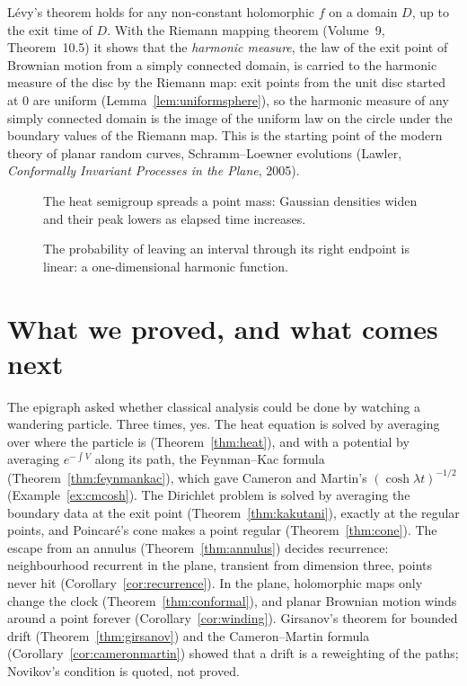 \begin{remark}
L\'evy's theorem holds for any non-constant holomorphic $f$ on a domain $D$, up to the exit time of $D$. With the Riemann mapping theorem (Volume~9, Theorem~10.5) it shows that the \emph{harmonic measure}, the law of the
exit point of Brownian motion from a simply connected domain, is carried to the harmonic measure of the disc by the Riemann map: exit points from the unit disc started at $0$ are uniform (Lemma~\ref{lem:uniformsphere}), so the
harmonic measure of any simply connected domain is the image of the uniform law on the circle under the boundary values of the Riemann map. This is the starting point of the modern theory of planar random curves,
Schramm--Loewner evolutions (Lawler, \emph{Conformally Invariant Processes in the Plane}, 2005).
\end{remark}

\begin{figure}[ht]
\centering
{}
\caption{The heat semigroup spreads a point mass: Gaussian densities widen and their peak lowers as elapsed time increases.}
\label{fig:v12heatspreading}
\end{figure}

\begin{figure}[ht]
\centering
{}
\caption{The probability of leaving an interval through its right endpoint is linear: a one-dimensional harmonic function.}
\label{fig:v12harmonicexit}
\end{figure}

\section{What we proved, and what comes next}

The epigraph asked whether classical analysis could be done by watching a wandering particle. Three times, yes. The heat equation is solved by
averaging over where the particle is (Theorem~\ref{thm:heat}), and with a potential by averaging $e^{-\int V}$ along its path, the Feynman--Kac formula
(Theorem~\ref{thm:feynmankac}), which gave Cameron and Martin's $(\cosh\lambda t)^{-1/2}$ (Example~\ref{ex:cmcosh}). The Dirichlet problem is solved by
averaging the boundary data at the exit point (Theorem~\ref{thm:kakutani}), exactly at the regular points, and Poincar\'e's cone makes a point regular
(Theorem~\ref{thm:cone}). The escape from an annulus (Theorem~\ref{thm:annulus}) decides recurrence: neighbourhood recurrent in the plane, transient from
dimension three, points never hit (Corollary~\ref{cor:recurrence}). In the plane, holomorphic maps only change the clock (Theorem~\ref{thm:conformal}), and
planar Brownian motion winds around a point forever (Corollary~\ref{cor:winding}). Girsanov's theorem for bounded drift (Theorem~\ref{thm:girsanov}) and the
Cameron--Martin formula (Corollary~\ref{cor:cameronmartin}) showed that a drift is a reweighting of the paths; Novikov's condition is quoted, not proved.

